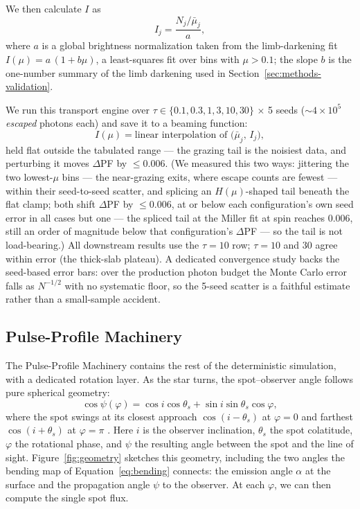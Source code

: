 \documentclass[twocolumn]{aastex701}
\begin{document}
We then calculate $I$ as
\begin{equation}
    I_j = \frac{N_j / \bar\mu_j}{a}, \label{eq:intensity}
\end{equation}
where $a$ is a global brightness normalization taken from the limb-darkening fit $I(\mu) =
a\,(1 + b\mu)$, a least-squares fit over bins with $\mu > 0.1$; the slope $b$ is the
one-number summary of the limb darkening used in Section~\ref{sec:methods-validation}.

We run this transport engine over $\tau \in \{0.1, 0.3, 1, 3, 10, 30\}$ $\times$ 5 seeds
($\sim 4 \times 10^5$ \emph{escaped}
photons each) and save it to a beaming function:
\begin{equation}
    I(\mu) = \text{linear interpolation of } \big(\bar\mu_j,\, I_j\big), \label{eq:lookup}
\end{equation}
held flat outside the tabulated range --- the grazing tail is the noisiest data, and
perturbing it moves $\Delta$PF by $\le 0.006$. (We measured this two ways: jittering the two
lowest-$\mu$ bins --- the near-grazing exits, where escape counts are fewest --- within
their seed-to-seed scatter, and splicing an $H(\mu)$-shaped tail beneath the flat clamp;
both shift $\Delta$PF by $\le 0.006$, at or below each configuration's own
seed error in all cases but one --- the spliced tail at the Miller fit at spin reaches
$0.006$, still an order of magnitude below that configuration's $\Delta$PF --- so the tail
is
not load-bearing.) All downstream results use the $\tau = 10$ row; $\tau = 10$ and $30$
agree within error (the thick-slab plateau). A dedicated convergence study backs the
seed-based error bars: over the production photon budget the Monte Carlo error falls as
$N^{-1/2}$ with no systematic floor, so the 5-seed scatter is a faithful estimate rather
than a small-sample accident.

\subsection{Pulse-Profile Machinery} \label{sec:methods-pulse}
The Pulse-Profile Machinery contains the rest of the deterministic simulation, with a
dedicated rotation layer.
As the star turns, the spot--observer angle follows pure spherical geometry:
\begin{equation}
\cos\psi(\varphi) = \cos i \cos\theta_s + \sin i \sin\theta_s \cos\varphi,
    \label{eq:geometry}
\end{equation}
where the spot swings at its closest approach $\cos(i-\theta_s)$ at $\varphi = 0$ and
farthest $\cos(i+\theta_s)$ at $\varphi = \pi$ \citep{PoutanenBeloborodov2006}. {Here $i$ is
the observer inclination, $\theta_s$ the spot colatitude, $\varphi$ the rotational phase,
and $\psi$ the resulting angle between the spot and the line of sight.}
Figure~\ref{fig:geometry} sketches this geometry, including the two angles the bending map
of Equation~\eqref{eq:bending} connects: the emission angle $\alpha$ at the surface and the
propagation angle $\psi$ to the observer. At each $\varphi$, we can then compute the single
spot flux.
\end{document}
